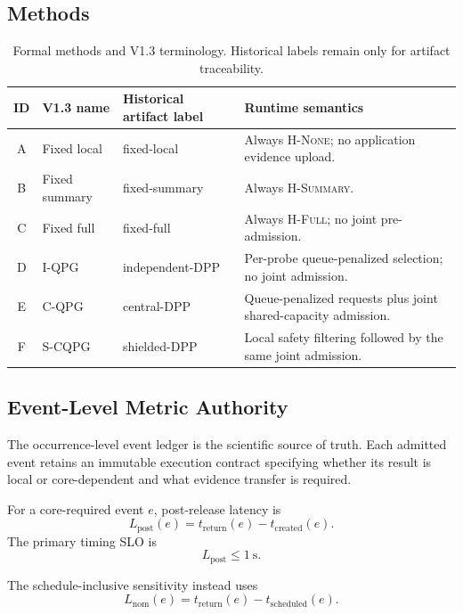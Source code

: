 \documentclass[10pt,journal]{IEEEtran}
\newcommand{\Hnone}{\textsc{H-None}}
\newcommand{\Hsummary}{\textsc{H-Summary}}
\newcommand{\Hfull}{\textsc{H-Full}}
\newcommand{\IQPG}{\textsc{I-QPG}}
\newcommand{\CQPG}{\textsc{C-QPG}}
\newcommand{\SCQPG}{\textsc{S-CQPG}}
\begin{document}
\subsection{Methods}

\begin{table}[t]
\centering
\caption{Formal methods and V1.3 terminology. Historical labels remain
only for artifact traceability.}
\label{tab:methods}
\small
\begin{tabular}{@{}clll@{}}
\toprule
ID & V1.3 name & Historical artifact label & Runtime semantics \\
\midrule
A & Fixed local & fixed-local &
Always \Hnone; no application evidence upload. \\
B & Fixed summary & fixed-summary &
Always \Hsummary. \\
C & Fixed full & fixed-full &
Always \Hfull; no joint pre-admission. \\
D & \IQPG & independent-DPP &
Per-probe queue-penalized selection; no joint admission. \\
E & \CQPG & central-DPP &
Queue-penalized requests plus joint shared-capacity admission. \\
F & \SCQPG & shielded-DPP &
Local safety filtering followed by the same joint admission. \\
\bottomrule
\end{tabular}
\end{table}

\subsection{Event-Level Metric Authority}

The occurrence-level event ledger is the scientific source of truth.
Each admitted event retains an immutable execution contract specifying
whether its result is local or core-dependent and what evidence transfer
is required.

For a core-required event $e$, post-release latency is
\begin{equation}
L_{\mathrm{post}}(e)
=
t_{\mathrm{return}}(e)
-
t_{\mathrm{created}}(e).
\label{eq:postlat}
\end{equation}
The primary timing SLO is
\begin{equation}
L_{\mathrm{post}}\leq1~\mathrm{s}.
\end{equation}

The schedule-inclusive sensitivity instead uses
\begin{equation}
L_{\mathrm{nom}}(e)
=
t_{\mathrm{return}}(e)
-
t_{\mathrm{scheduled}}(e).
\label{eq:nomlat}
\end{equation}
\end{document}
